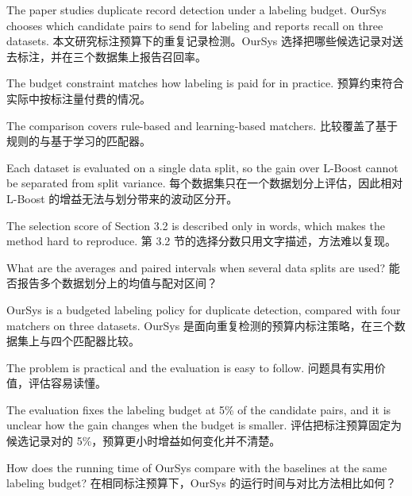 
%
{The paper studies duplicate record detection under a labeling budget. OurSys chooses which candidate pairs to send for labeling and reports recall on three datasets.}%
{本文研究标注预算下的重复记录检测。OurSys 选择把哪些候选记录对送去标注，并在三个数据集上报告召回率。}

%
{The budget constraint matches how labeling is paid for in practice.}%
{预算约束符合实际中按标注量付费的情况。}

%
{The comparison covers rule-based and learning-based matchers.}%
{比较覆盖了基于规则的与基于学习的匹配器。}

%
{Each dataset is evaluated on a single data split, so the gain over L-Boost cannot be separated from split variance.}%
{每个数据集只在一个数据划分上评估，因此相对 L-Boost 的增益无法与划分带来的波动区分开。}

%
{The selection score of Section 3.2 is described only in words, which makes the method hard to reproduce.}%
{第 3.2 节的选择分数只用文字描述，方法难以复现。}

%
{What are the averages and paired intervals when several data splits are used?}%
{能否报告多个数据划分上的均值与配对区间？}

%
{OurSys is a budgeted labeling policy for duplicate detection, compared with four matchers on three datasets.}%
{OurSys 是面向重复检测的预算内标注策略，在三个数据集上与四个匹配器比较。}

%
{The problem is practical and the evaluation is easy to follow.}%
{问题具有实用价值，评估容易读懂。}

%
{The evaluation fixes the labeling budget at 5\% of the candidate pairs, and it is unclear how the gain changes when the budget is smaller.}%
{评估把标注预算固定为候选记录对的 5\%，预算更小时增益如何变化并不清楚。}

%
{How does the running time of OurSys compare with the baselines at the same labeling budget?}%
{在相同标注预算下，OurSys 的运行时间与对比方法相比如何？}
